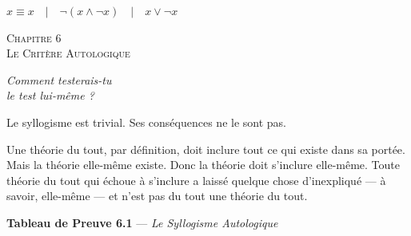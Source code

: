 \documentclass[10pt, openany, oneside]{book}
\renewcommand{\large}{\fontsize{11.5}{14}\selectfont}
\renewcommand{\huge}{\fontsize{17}{21}\selectfont}
\begin{document}
\vspace{0.5em}

\begin{center}
    $x \equiv x \quad | \quad \neg(x \wedge \neg x) \quad | \quad x \vee \neg x$
\end{center}

%
%
%
%

\newpage

\begin{center}
    {\huge\scshape Chapitre 6}\\[0.3em]
    {\large\scshape Le Critère Autologique}
\end{center}

\vspace{1.5em}

\begin{center}
    \itshape
    Comment testerais-tu\\
    le test lui-même ?
\end{center}

\vspace{2em}


\noindent Le syllogisme est trivial. Ses conséquences ne le sont pas.

Une théorie du tout, par définition, doit inclure tout ce qui existe dans sa portée. Mais la théorie elle-même existe. Donc la théorie doit s'inclure elle-même. Toute théorie du tout qui échoue à s'inclure a laissé quelque chose d'inexpliqué --- à savoir, elle-même --- et n'est pas du tout une théorie du tout.



\vspace{0.5em}

\textbf{Tableau de Preuve 6.1} --- \textit{Le Syllogisme Autologique}

\vspace{0.5em}
\end{document}
